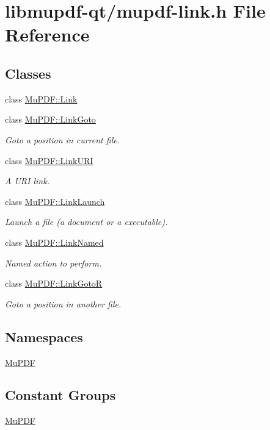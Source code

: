 \hypertarget{mupdf-link_8h}{\section{libmupdf-\/qt/mupdf-\/link.h File Reference}
\label{mupdf-link_8h}
}
\subsection*{Classes}
\begin{DoxyCompactItemize}
\item 
class \hyperlink{class_mu_p_d_f_1_1_link}{Mu\-P\-D\-F\-::\-Link}
\item 
class \hyperlink{class_mu_p_d_f_1_1_link_goto}{Mu\-P\-D\-F\-::\-Link\-Goto}
\begin{DoxyCompactList}\small\item\em Goto a position in current file. \end{DoxyCompactList}\item 
class \hyperlink{class_mu_p_d_f_1_1_link_u_r_i}{Mu\-P\-D\-F\-::\-Link\-U\-R\-I}
\begin{DoxyCompactList}\small\item\em A U\-R\-I link. \end{DoxyCompactList}\item 
class \hyperlink{class_mu_p_d_f_1_1_link_launch}{Mu\-P\-D\-F\-::\-Link\-Launch}
\begin{DoxyCompactList}\small\item\em Launch a file (a document or a executable). \end{DoxyCompactList}\item 
class \hyperlink{class_mu_p_d_f_1_1_link_named}{Mu\-P\-D\-F\-::\-Link\-Named}
\begin{DoxyCompactList}\small\item\em Named action to perform. \end{DoxyCompactList}\item 
class \hyperlink{class_mu_p_d_f_1_1_link_goto_r}{Mu\-P\-D\-F\-::\-Link\-Goto\-R}
\begin{DoxyCompactList}\small\item\em Goto a position in another file. \end{DoxyCompactList}\end{DoxyCompactItemize}
\subsection*{Namespaces}
\begin{DoxyCompactItemize}
\item 
\hyperlink{namespace_mu_p_d_f}{Mu\-P\-D\-F}
\end{DoxyCompactItemize}
\subsection*{Constant Groups}
\begin{DoxyCompactItemize}
\item 
\hyperlink{namespace_mu_p_d_f}{Mu\-P\-D\-F}
\end{DoxyCompactItemize}
